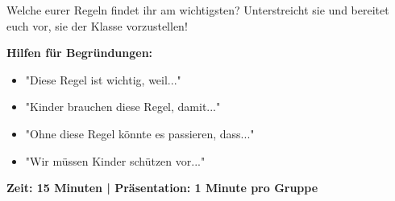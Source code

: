 \documentclass[12pt, a4paper]{article}
\newenvironment{taskbox}{%
    \begin{framed}
        \color{black}
    }{%
    \end{framed}
}
\begin{document}
    \begin{taskbox}
        Welche eurer Regeln findet ihr am wichtigsten? Unterstreicht sie und bereitet euch vor, sie der Klasse vorzustellen!

        \vspace{0.3cm}
        \textbf{Hilfen für Begründungen:}
        \begin{itemize}
            \item "Diese Regel ist wichtig, weil..."
            \item "Kinder brauchen diese Regel, damit..."
            \item "Ohne diese Regel könnte es passieren, dass..."
            \item "Wir müssen Kinder schützen vor..."
        \end{itemize}
    \end{taskbox}

    \vspace{0.5cm}
    \centering\large\textbf{Zeit: 15 Minuten | Präsentation: 1 Minute pro Gruppe}
\end{document}
